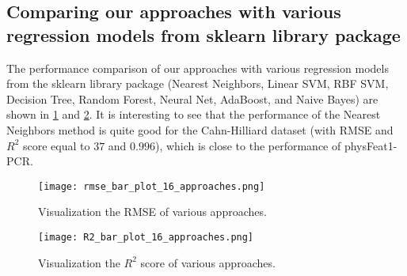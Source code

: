\documentclass[11pt, authoryear]{elsarticle}
\renewcommand\textcolor[2]{#2}
\begin{document}
\begin{appendix}
		\section{Comparing our approaches with various regression models from sklearn library package}
		\label{appendix:compare_sklearn}
		\textcolor{red}{
			The performance comparison of our approaches with various regression models from the sklearn library package (Nearest Neighbors, Linear SVM, RBF SVM, Decision Tree, Random Forest, Neural Net, AdaBoost, and Naive Bayes) are shown in \cref{fig:compare_sklearn_rmse} and \cref{fig:compare_sklearn_R2}. It is interesting to see that the performance of the Nearest Neighbors method is quite good for the Cahn-Hilliard dataset (with \gls{RMSE} and $R^2$ score equal to $37$ and $0.996$), which is close to the performance of physFeat1-PCR.
		}
		\begin{figure}
			\centering
			\texttt{[image: rmse\_bar\_plot\_16\_approaches.png]}
			\caption[]{Visualization the \gls{RMSE} of various approaches.}	
			\label{fig:compare_sklearn_rmse}
		\end{figure}
		\begin{figure}
			\centering
			\texttt{[image: R2\_bar\_plot\_16\_approaches.png]}
			\caption[]{Visualization the $R^2$ score of various approaches.}	
			\label{fig:compare_sklearn_R2}
		\end{figure}
		

\end{appendix}
\end{document}
